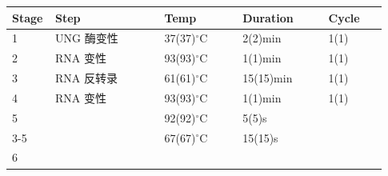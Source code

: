 \documentclass[UTF8,10pt,a4paper,fontset=fandol]{ctexart}
\newcommand{\fieldvalue}[1]{#1}
\newcommand{\handwritten}[1]{#1}
\begin{document}
\begin{tabular}{|p{0.08\linewidth}|p{0.28\linewidth}|p{0.20\linewidth}|p{0.22\linewidth}|p{0.15\linewidth}|}
\hline
Stage & Step & Temp & Duration & Cycle \\
\hline
1 & UNG 酶变性 &
\fieldvalue{\handwritten{37}}(37)$^\circ$C &
\fieldvalue{\handwritten{2}}(2)min &
\fieldvalue{\handwritten{1}}(1) \\
\hline
2 & RNA 变性 &
\fieldvalue{\handwritten{93}}(93)$^\circ$C &
\fieldvalue{\handwritten{1}}(1)min &
\fieldvalue{\handwritten{1}}(1) \\
\hline
3 & RNA 反转录 &
\fieldvalue{\handwritten{61}}(61)$^\circ$C &
\fieldvalue{\handwritten{15}}(15)min &
\fieldvalue{\handwritten{1}}(1) \\
\hline
4 & RNA 变性 &
\fieldvalue{\handwritten{93}}(93)$^\circ$C &
\fieldvalue{\handwritten{1}}(1)min &
\fieldvalue{\handwritten{1}}(1) \\
\hline
5 & &
\fieldvalue{\handwritten{92}}(92)$^\circ$C &
\fieldvalue{\handwritten{5}}(5)s &
\\
\cline{3-5}
 & &
\fieldvalue{\handwritten{67}}(67)$^\circ$C &
\fieldvalue{\handwritten{15}}(15)s &
\\
\hline
6 & &

\end{tabular}
\end{document}
